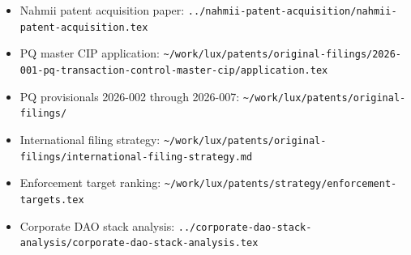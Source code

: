 \documentclass[11pt,letterpaper]{article}
\begin{document}
\begin{itemize}
\item Nahmii patent acquisition paper: \texttt{../nahmii-patent-acquisition/nahmii-patent-acquisition.tex}
\item PQ master CIP application: \texttt{\textasciitilde/work/lux/patents/original-filings/2026-001-pq-transaction-control-master-cip/application.tex}
\item PQ provisionals 2026-002 through 2026-007: \texttt{\textasciitilde/work/lux/patents/original-filings/}
\item International filing strategy: \texttt{\textasciitilde/work/lux/patents/original-filings/international-filing-strategy.md}
\item Enforcement target ranking: \texttt{\textasciitilde/work/lux/patents/strategy/enforcement-targets.tex}
\item Corporate DAO stack analysis: \texttt{../corporate-dao-stack-analysis/corporate-dao-stack-analysis.tex}
\end{itemize}
\end{document}
